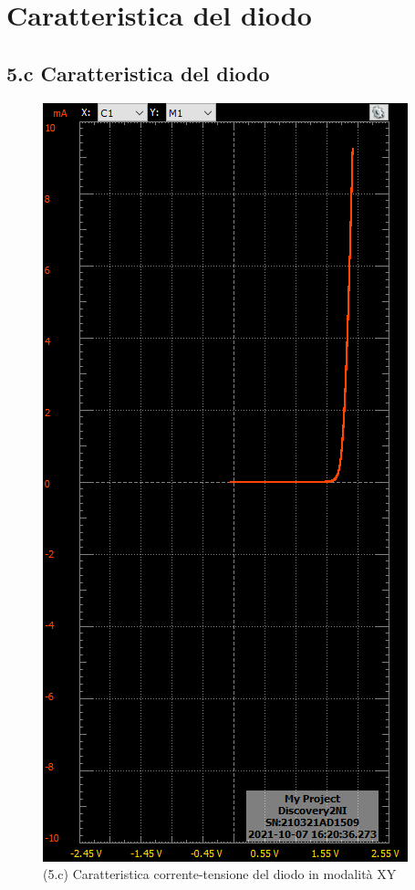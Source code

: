 \documentclass[10pt, a4paper, italian]{article}
\begin{document}
\section{Caratteristica del diodo}
\par

\subsection*{5.c Caratteristica del diodo}

\begin{figure}[htb]
\centering
\includegraphics[scale=0.4]{shockley_new}
\caption{(5.c) Caratteristica corrente-tensione del diodo in modalit\`a XY}
\end{figure}
\end{document}
